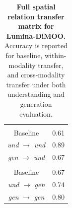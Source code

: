 \begin{table}[t]
\begin{minipage}[t]{0.24\textwidth}
{\begin{tabular}{c|c}
\rowcolor{gray!15}
\multicolumn{2}{l}{\textit{Understanding Evaluation}} \\
Baseline & 0.61 \\
\textit{und} $\rightarrow$ \textit{und} & 0.89 \\
\textit{gen} $\rightarrow$ \textit{und} & 0.67 \\
\midrule
\rowcolor{gray!15}
\multicolumn{2}{l}{\textit{Generation Evaluation}} \\
Baseline & 0.67 \\
\textit{und} $\rightarrow$ \textit{gen} & 0.74 \\
\textit{gen} $\rightarrow$ \textit{gen} & 0.80 \\
\bottomrule
\end{tabular}
}
\captionsetup{type=table}
\caption{\textbf{Full spatial relation transfer matrix for Lumina-DiMOO.} Accuracy is reported for baseline, within-modality transfer, and cross-modality transfer under both understanding and generation evaluation.}
\label{tab:appendix_spatial_full}
\end{minipage}
\end{table}
